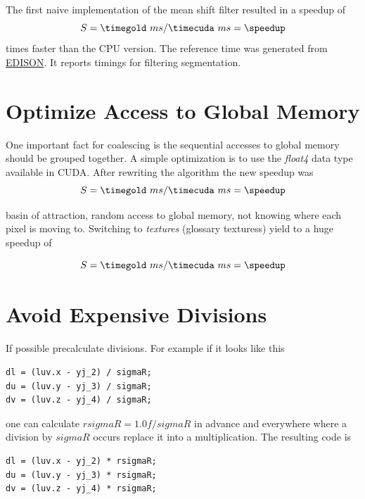 The first naive implementation of the mean shift filter resulted in a speedup of
\begin{equation*}\label{eq:speedup0}
	S = \timegold\ ms/\timecuda\ ms= \speedup
\end{equation*}
times faster than the \gls{CPU} version. The reference time was
generated from
\href{http://www.caip.rutgers.edu/riul/research/code.html}{ \gls{EDISON}}. It
reports timings for filtering segmentation.

\section*{Optimize Access to Global Memory}
\label{sec:coalescing}

One important fact for coalescing is the sequential accesses to global memory
should be grouped together. A simple optimization is to use the \emph{float4}
data type available in \gls{CUDA}. After rewriting the algorithm the new speedup
was 
\fpDiv{\speedup}{\timegold}{\timecuda}
\begin{equation*}\label{eq:speedup0}
	S = \timegold\ ms/\timecuda\ ms = \speedup
\end{equation*}

basin of attraction, random access to global memory, not knowing where each pixel
is moving to. Switching to \emph{textures} (glossary texturess) yield to a huge
speedup of 

\fpDiv{\speedup}{\timegold}{\timecuda}
\begin{equation*}\label{eq:speedup0}
	S = \timegold\ ms/\timecuda\ ms = \speedup
\end{equation*}


\section*{Avoid Expensive Divisions}
\label{sec:expensive_divisions}

If possible precalculate divisions. For example if it looks like this
\begin{lstlisting}[caption=Divison, label=lst:division]
dl = (luv.x - yj_2) / sigmaR;               
du = (luv.y - yj_3) / sigmaR;               
dv = (luv.z - yj_4) / sigmaR;
\end{lstlisting}
one can calculate $rsigmaR = 1.0f/sigmaR$ in advance and everywhere where a division by
$sigmaR$ occurs replace it into a multiplication. The resulting code is
\begin{lstlisting}[caption=Precalculated Divison, label=lst:precalcdivision]
dl = (luv.x - yj_2) * rsigmaR;               
du = (luv.y - yj_3) * rsigmaR;               
dv = (luv.z - yj_4) * rsigmaR;
\end{lstlisting}

